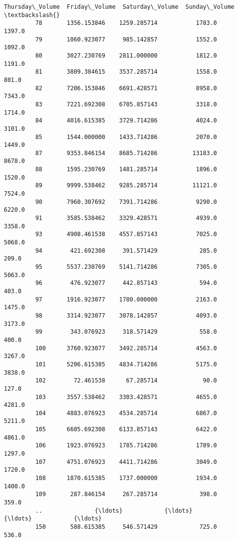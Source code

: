 \documentclass[11pt]{article}
\begin{document}
\begin{Verbatim}[commandchars=\\\{\}]
              Thursday\_Volume  Friday\_Volume  Saturday\_Volume  Sunday\_Volume  \textbackslash{}
         78       1356.153846    1259.285714           1783.0         1397.0   
         79       1060.923077     985.142857           1552.0         1092.0   
         80       3027.230769    2811.000000           1812.0         1191.0   
         81       3809.384615    3537.285714           1558.0          801.0   
         82       7206.153846    6691.428571           8958.0         7343.0   
         83       7221.692308    6705.857143           3318.0         1714.0   
         84       4016.615385    3729.714286           4024.0         3101.0   
         85       1544.000000    1433.714286           2070.0         1449.0   
         87       9353.846154    8685.714286          13183.0         8678.0   
         88       1595.230769    1481.285714           1896.0         1520.0   
         89       9999.538462    9285.285714          11121.0         7524.0   
         90       7960.307692    7391.714286           9290.0         6220.0   
         91       3585.538462    3329.428571           4939.0         3358.0   
         93       4908.461538    4557.857143           7025.0         5068.0   
         94        421.692308     391.571429            285.0          209.0   
         95       5537.230769    5141.714286           7305.0         5063.0   
         96        476.923077     442.857143            594.0          403.0   
         97       1916.923077    1780.000000           2163.0         1475.0   
         98       3314.923077    3078.142857           4093.0         3173.0   
         99        343.076923     318.571429            558.0          400.0   
         100      3760.923077    3492.285714           4563.0         3267.0   
         101      5206.615385    4834.714286           5175.0         3838.0   
         102        72.461538      67.285714             90.0          127.0   
         103      3557.538462    3303.428571           4655.0         4281.0   
         104      4883.076923    4534.285714           6867.0         5211.0   
         105      6605.692308    6133.857143           6422.0         4861.0   
         106      1923.076923    1785.714286           1789.0         1297.0   
         107      4751.076923    4411.714286           3049.0         1720.0   
         108      1870.615385    1737.000000           1934.0         1400.0   
         109       287.846154     267.285714            398.0          359.0   
         ..               {\ldots}            {\ldots}              {\ldots}            {\ldots}   
         150       588.615385     546.571429            725.0          536.0   

\end{Verbatim}
\end{document}
